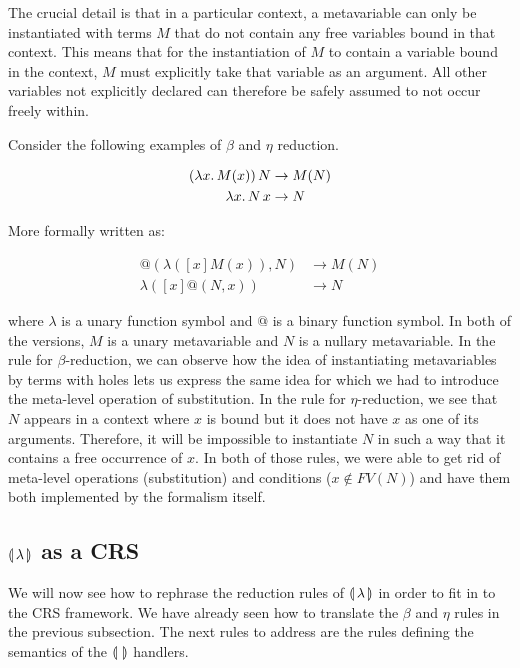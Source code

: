 The crucial detail is that in a particular context, a metavariable can only
be instantiated with terms $M$ that do not contain any free variables bound
in that context. This means that for the instantiation of $M$ to contain a
variable bound in the context, $M$ must explicitly take that variable as an
argument. All other variables not explicitly declared can therefore be
safely assumed to not occur freely within.

Consider the following examples of $\beta$ and $\eta$ reduction.

\begin{align*}
  (\lambda x.\, M(x))\,N & \to M(N) \\
  \lambda x.\, N\,x & \to N
\end{align*}

More formally written as:

\begin{align*}
  @(\lambda([x]M(x)),N) & \to M(N) \\
  \lambda([x]@(N,x)) & \to N
\end{align*}

where $\lambda$ is a unary function symbol and $@$ is a binary function
symbol. In both of the versions, $M$ is a unary metavariable and $N$ is a
nullary metavariable. In the rule for $\beta$-reduction, we can observe how
the idea of instantiating metavariables by terms with holes lets us express
the same idea for which we had to introduce the meta-level operation of
substitution. In the rule for $\eta$-reduction, we see that $N$ appears in
a context where $x$ is bound but it does not have $x$ as one of its
arguments. Therefore, it will be impossible to instantiate $N$ in such a
way that it contains a free occurrence of $x$. In both of those rules, we
were able to get rid of meta-level operations (substitution) and conditions
($x \notin FV(N)$) and have them both implemented by the formalism itself.


\subsection{\texorpdfstring{$\llparenthesis \, \lambda \, \rrparenthesis$}{Our Calculus} as a CRS}
\label{ssec:banana-as-crs}

We will now see how to rephrase the reduction rules of $\llparenthesis \, \lambda \, \rrparenthesis$ in
order to fit in to the CRS framework. We have already seen how to translate
the $\beta$ and $\eta$ rules in the previous subsection. The next
rules to address are the rules defining the semantics of the $\llparenthesis \,  \, \rrparenthesis$
handlers.

